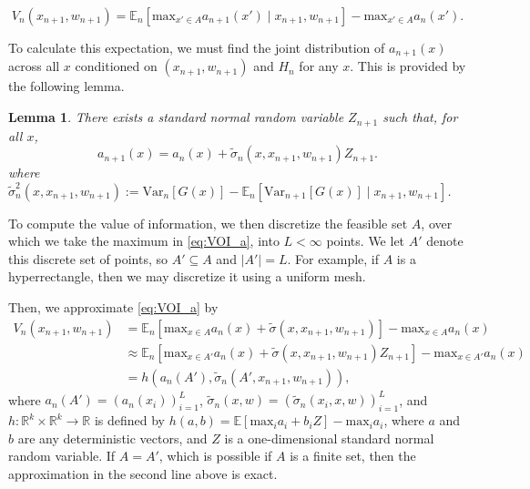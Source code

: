 \documentclass{article} %
\newcommand{\w}{w}
\newcommand{\sigmatilde}{\tilde{\sigma}}
\newtheorem{lemma}{Lemma}
\begin{document}
\begin{equation}
V_{n}\left(x_{n+1},\w_{n+1}\right)=\mathbb{E}_{n}\left[\mbox{max}_{x'\in A}a_{n+1}\left(x'\right) \mid x_{n+1},\w_{n+1}\right]-\mbox{max}_{x' \in A} a_{n}\left(x'\right).
\label{eq:VOI_a}
\end{equation}

To calculate this expectation, we must find the joint distribution of $a_{n+1}\left(x\right)$ across all $x$ conditioned on $\left(x_{n+1},\w_{n+1}\right)$ and $H_{n}$ for any $x$. 
This is provided by the following lemma.


\begin{lemma}
There exists a standard normal random variable $Z_{n+1}$ such that, for all $x$,\\
\begin{equation*}
    a_{n+1}\left(x\right) =  a_{n}\left(x\right)+\sigmatilde_n(x,x_{n+1},\w_{n+1})Z_{n+1}.
\end{equation*}
where 
$\sigmatilde^2_n(x,x_{n+1},\w_{n+1}) := \mbox{Var}_{n}\left[G\left(x\right)\right]-\mathbb{E}_{n}\left[\mbox{Var}_{n+1}\left[G\left(x\right)\right]\mid x_{n+1},\w_{n+1}\right]$.
\end{lemma}


To compute the value of information, we then discretize the feasible set $A$, over which we take the maximum in \eqref{eq:VOI_a}, into $L<\infty$ points.  We let $A'$ denote this discrete set of points, so $A' \subseteq A$ and $|A'|=L$. For example, if $A$ is a hyperrectangle, then we may discretize it using a uniform mesh.

Then, we approximate \eqref{eq:VOI_a} by
\begin{align*}
V_n(x_{n+1},\w_{n+1}) 
&= \mathbb{E}_{n}\left[\mbox{max}_{x\in A} a_{n}\left(x\right) + \sigmatilde(x, x_{n+1},\w_{n+1})\right]-\mbox{max}_{x \in A} a_{n}\left(x\right)\\
&\approx \mathbb{E}_{n}\left[\mbox{max}_{x\in A'} a_{n}\left(x\right) + \sigmatilde(x, x_{n+1},\w_{n+1})Z_{n+1}\right]-\mbox{max}_{x \in A'} a_{n}\left(x\right)\\
&=h(a_n(A'),\sigmatilde_n(A',x_{n+1},\w_{n+1})),
\end{align*}
where 
$a_{n}(A')=\left(a_{n}\left(x_{i}\right)\right)_{i=1}^{L}$,
$\tilde{\sigma}_{n}\left(x,\w\right)=\left(\tilde{\sigma}_{n}\left(x_{i},x,\w\right)\right)_{i=1}^{L}$, and 
$h:\mathbb{R}^{k}\times\mathbb{R}^{k}\rightarrow\mathbb{R}$ is defined
by $h\left(a,b\right)=\mathbb{E}\left[\mbox{max}_{i}a_{i}+b_{i}Z\right]-\mbox{max}_{i}a_{i}$,
where $a$ and $b$ are any deterministic vectors, and $Z$ is a one-dimensional
standard normal random variable. 
If $A = A'$, which is possible if $A$ is a finite set, then the approximation in the second line above is exact.
\end{document}
